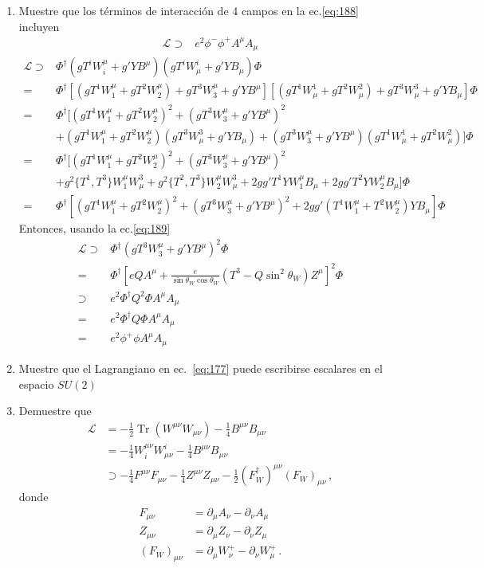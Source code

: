 \begin{enumerate}
 \item Muestre que los t\'erminos de interacci\'on de 4 campos en la ec.\eqref{eq:188} incluyen
   \begin{align}
     \label{eq:190}
       \mathcal{L}\supset&e^2\phi^-\phi^+A^\mu A_\mu
   \end{align}
   \begin{align}
     \mathcal{L}\supset&\Phi^\dagger(gT^iW^\mu_i+g'YB^\mu)(gT^iW_\mu^i+g'YB_\mu)\Phi\nonumber\\
     =&\Phi^\dagger[(gT^1W^\mu_1+gT^2W^\mu_2)+gT^3W^\mu_3+g'YB^\mu][(gT^1W_\mu^1+gT^2W_\mu^2)+gT^3W_\mu^3+g'YB_\mu]\Phi\nonumber\\
     =&\Phi^\dagger[(gT^1W^\mu_1+gT^2W^\mu_2)^2+(gT^3W^\mu_3+g'YB^\mu)^2\nonumber\\
     & +(gT^1W^\mu_1+gT^2W^\mu_2)(gT^3W_\mu^3+g'YB_\mu)+ (gT^3W^\mu_3+g'YB^\mu)(gT^1W_\mu^1+gT^2W_\mu^2)]\Phi\nonumber\\
     =&\Phi^\dagger[(gT^1W^\mu_1+gT^2W^\mu_2)^2+(gT^3W^\mu_3+g'YB^\mu)^2\nonumber\\
     & +g^2\{T^1,T^3\}W^\mu_1W_\mu^3+g^2\{T^2,T^3\}W^\mu_2W_\mu^3+2gg'T^1YW^\mu_1B_\mu+2gg'T^2YW^\mu_2B_\mu]\Phi\nonumber\\
     =&\Phi^\dagger[(gT^1W^\mu_1+gT^2W^\mu_2)^2+(gT^3W^\mu_3+g'YB^\mu)^2+2gg'(T^1W^\mu_1+T^2W^\mu_2)YB_\mu]\Phi
   \end{align}
   Entonces, usando la ec.\eqref{eq:189}
\begin{align}
  \mathcal{L}\supset&\Phi^\dagger(gT^3W^\mu_3+g'YB^\mu)^2\Phi\nonumber\\
  =&\Phi^\dagger[eQA^\mu+\frac{e}{\sin\theta_W \cos\theta_W}\left(T^3-Q\sin^2\theta_W\right)Z^\mu]^2\Phi\nonumber\\
  \supset&e^2\Phi^\dagger Q^2\Phi A^\mu A_\mu\nonumber\\
  =&e^2\Phi^\dagger Q\Phi A^\mu A_\mu\nonumber\\
  =&e^2\phi^+\phi A^\mu A_\mu
\end{align}
  \label{item:pch3.4a}  %


 \item Muestre que el Lagrangiano en ec.~\eqref{eq:177} puede escribirse escalares en el espacio $SU(2)$
  \label{item:pch3.4} %


\item Demuestre que
\begin{align*}
  \mathcal{L}&=-\tfrac{1}{2}\operatorname{Tr}\left(W^{\mu\nu}W_{\mu\nu}\right)-\tfrac{1}{4}B^{\mu\nu}B_{\mu\nu}\\
  &=-\tfrac{1}{4}W^{\mu\nu}_iW_{\mu\nu}^i-\tfrac{1}{4}B^{\mu\nu}B_{\mu\nu}\\
  &\supset-\tfrac{1}{4}F^{\mu\nu}F_{\mu\nu}-\tfrac{1}{4}Z^{\mu\nu}Z_{\mu\nu}-\frac{1}{2}(F^\dagger_W)^{\mu\nu}(F_W)_{\mu\nu}\,,
\end{align*}
donde
\begin{align*}
  F_{\mu\nu}&=\partial_\mu A_\nu-\partial_\nu A_\mu\\
  Z_{\mu\nu}&=\partial_\mu Z_\nu-\partial_\nu Z_\mu\\
  (F_W)_{\mu\nu}&=\partial_\mu W_\nu^+-\partial_\nu W_\mu^+\,.
\end{align*}
  \label{item:pch3.5} %


\end{enumerate}
